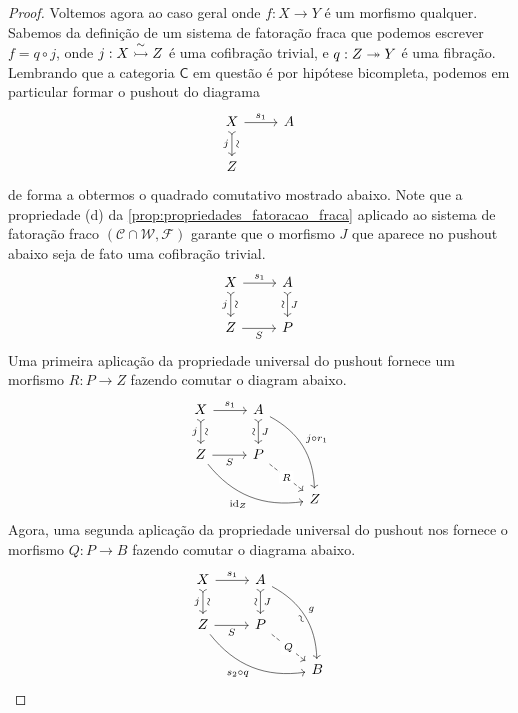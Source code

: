 \begin{proof}
  Voltemos agora ao caso geral onde $f: X \to Y$ é um morfismo qualquer.
  Sabemos da definição de um sistema de fatoração fraca que podemos escrever $f = q \circ j$, onde $j: X \overset{\sim}{\rightarrowtail} Z$ é uma cofibração trivial, e $q: Z \twoheadrightarrow Y$ é uma fibração.
  Lembrando que a categoria $\mathsf{C}$ em questão é por hipótese bicompleta, podemos em particular formar o pushout do diagrama
  \begin{displaymath}
    \begin{tikzcd}
      X
      \arrow[r, "s_{1}"]
      \arrow[d, tail, "j" {swap}, "\sim" {sloped}]
      & A
      \\ Z
    \end{tikzcd}
  \end{displaymath}
  de forma a obtermos o quadrado comutativo mostrado abaixo.
  Note que a propriedade (d) da \cref{prop:propriedades_fatoracao_fraca} aplicado ao sistema de fatoração fraco $(\mathcal{C} \cap \mathcal{W},\mathcal{F})$ garante que o morfismo $J$ que aparece no pushout abaixo seja de fato uma cofibração trivial.
  \begin{displaymath}
    \begin{tikzcd}
      X
      \arrow[r, "s_{1}"]
      \arrow[d, tail, "j" {swap}, "\sim" {sloped}]
      & A
      \arrow[d, tail , "J", "\sim" {swap,sloped}]
      \\ Z
      \arrow[r, "S" swap]
      & P
    \end{tikzcd}
  \end{displaymath}
  Uma primeira aplicação da propriedade universal do pushout fornece um morfismo $R: P \to Z$ fazendo comutar o diagram abaixo.
  \begin{displaymath}
    \begin{tikzcd}
       X
      \arrow[r, "s_{1}"]
      \arrow[d, tail, "j" {swap}, "\sim" {sloped}]
      & A
      \arrow[d, tail , "J", "\sim" {swap,sloped}]
      \arrow[rdd, bend left=30, "j \circ r_{1}"]
      \\ Z
      \arrow[r, "S" swap]
      \arrow[rrd, bend right=30, "\id_{Z}" swap]
      & P
      \arrow[rd, dashed, "R" description]
      \\ & & Z
    \end{tikzcd}
  \end{displaymath}
  Agora, uma segunda aplicação da propriedade universal do pushout nos fornece o morfismo $Q: P \to B$ fazendo comutar o diagrama abaixo.
  \begin{displaymath}
    \begin{tikzcd}
      X
      \arrow[r, "s_{1}"]
      \arrow[d, tail, "j" {swap}, "\sim" {sloped}]
      & A
      \arrow[d, tail , "J", "\sim" {swap,sloped}]
      \arrow[rdd, bend left=30, "g", "\sim" {swap,sloped}]
      \\ Z
      \arrow[r, "S" swap]
      \arrow[rrd, bend right=30, "s_{2} \circ q" swap]
      & P
      \arrow[rd, dashed, "Q" description]
      \\ & & B
    \end{tikzcd}
  \end{displaymath}


\end{proof}

